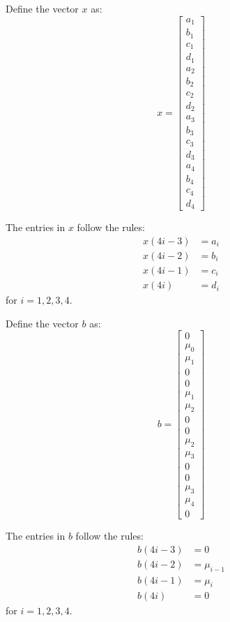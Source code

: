 \documentclass{article}
\begin{document}
Define the vector \( x \) as:
\[
    x = \begin{bmatrix}
        a_1 \\ b_1 \\ c_1 \\ d_1 \\
        a_2 \\ b_2 \\ c_2 \\ d_2 \\
        a_3 \\ b_3 \\ c_3 \\ d_3 \\
        a_4 \\ b_4 \\ c_4 \\ d_4
    \end{bmatrix}
\]

The entries in \( x \) follow the rules:
\begin{align*}
    x(4i - 3) & = a_i \\
    x(4i - 2) & = b_i \\
    x(4i - 1) & = c_i \\
    x(4i)     & = d_i
\end{align*}
for \( i = 1, 2, 3, 4 \).

Define the vector \( b \) as:
\[
    b = \begin{bmatrix}
        0 \\ \mu_0 \\ \mu_1 \\ 0 \\
        0 \\ \mu_1 \\ \mu_2 \\ 0 \\
        0 \\ \mu_2 \\ \mu_3 \\ 0 \\
        0 \\ \mu_3 \\ \mu_4 \\ 0
    \end{bmatrix}
\]

The entries in \( b \) follow the rules:
\begin{align*}
    b(4i - 3) & = 0         \\
    b(4i - 2) & = \mu_{i-1} \\
    b(4i - 1) & = \mu_i     \\
    b(4i)     & = 0
\end{align*}
for \( i = 1, 2, 3, 4 \).
\end{document}
